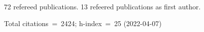 72 refereed publications. 13 refeered publications as first author.

Total citations~=~2424; h-index~=~25 (2022-04-07)
